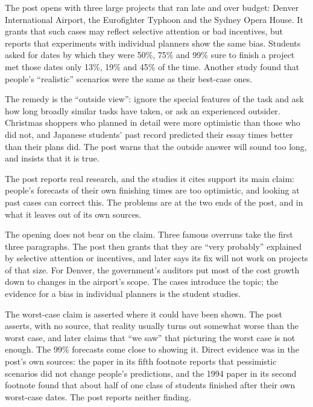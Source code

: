 \begin{afterword}
\summaryhead

The post opens with three large projects that ran late and over budget: Denver International Airport, the Eurofighter Typhoon and the Sydney Opera House. It grants that such cases may reflect selective attention or bad incentives, but reports that experiments with individual planners show the same bias. Students asked for dates by which they were 50\%, 75\% and 99\% sure to finish a project met those dates only 13\%, 19\% and 45\% of the time. Another study found that people's ``realistic'' scenarios were the same as their best-case ones.

The remedy is the ``outside view'': ignore the special features of the task and ask how long broadly similar tasks have taken, or ask an experienced outsider. Christmas shoppers who planned in detail were more optimistic than those who did not, and Japanese students' past record predicted their essay times better than their plans did. The post warns that the outside answer will sound too long, and insists that it is true.

\responsehead

The post reports real research, and the studies it cites support its main claim: people's forecasts of their own finishing times are too optimistic, and looking at past cases can correct this. The problems are at the two ends of the post, and in what it leaves out of its own sources.

The opening does not bear on the claim. Three famous overruns take the first three paragraphs. The post then grants that they are ``very probably'' explained by selective attention or incentives, and later says its fix will not work on projects of that size. For Denver, the government's auditors put most of the cost growth down to changes in the airport's scope. The cases introduce the topic; the evidence for a bias in individual planners is the student studies.

The worst-case claim is asserted where it could have been shown. The post asserts, with no source, that reality usually turns out somewhat worse than the worst case, and later claims that ``we saw'' that picturing the worst case is not enough. The 99\% forecasts come close to showing it. Direct evidence was in the post's own sources: the paper in its fifth footnote reports that pessimistic scenarios did not change people's predictions, and the 1994 paper in its second footnote found that about half of one class of students finished after their own worst-case dates. The post reports neither finding.


\end{afterword}
